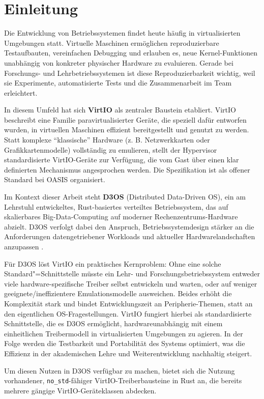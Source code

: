 \chapter{Einleitung}

Die Entwicklung von Betriebssystemen findet heute häufig in virtualisierten Umgebungen statt. Virtuelle Maschinen ermöglichen reproduzierbare Testaufbauten, vereinfachen Debugging und erlauben es, neue Kernel-Funktionen unabhängig von konkreter physischer Hardware zu evaluieren. Gerade bei Forschungs- und Lehrbetriebssystemen ist diese Reproduzierbarkeit wichtig, weil sie Experimente, automatisierte Tests und die Zusammenarbeit im Team erleichtert.

In diesem Umfeld hat sich \textbf{VirtIO} als zentraler Baustein etabliert. VirtIO beschreibt eine Familie paravirtualisierter Geräte, die speziell dafür entworfen wurden, in virtuellen Maschinen effizient bereitgestellt und genutzt zu werden. Statt komplexe “klassische” Hardware (z. B. Netzwerkkarten oder Grafikkartenmodelle) vollständig zu emulieren, stellt der Hypervisor standardisierte VirtIO-Geräte zur Verfügung, die vom Gast über einen klar definierten Mechanismus angesprochen werden. Die Spezifikation ist als offener Standard bei OASIS organisiert.

Im Kontext dieser Arbeit steht \textbf{D3OS} (Distributed Data-Driven OS), ein am Lehrstuhl entwickeltes, Rust-basiertes verteiltes Betriebssystem, das auf skalierbares Big-Data-Com\-pu\-ting auf moderner Rechenzentrums-Hardware abzielt. D3OS verfolgt dabei den Anspruch, Betriebssystemdesign stärker an die Anforderungen datengetriebener Workloads und aktueller Hardwarelandschaften anzupassen \cite{hhu_hermes}.

Für D3OS löst VirtIO ein praktisches Kernproblem: Ohne eine solche Standard"=Schnittstelle müsste ein Lehr- und Forschungsbetriebssystem entweder viele hardware-spezifische Treiber selbst entwickeln und warten, oder auf weniger geeignete/ineffizientere Emulationsmodelle ausweichen. Beides erhöht die Komplexität stark und bindet Entwicklungszeit an Peripherie-Themen, statt an den eigentlichen OS-Fragestellungen. VirtIO fungiert hierbei als standardisierte Schnittstelle, die es D3OS ermöglicht, hardwareunabhängig mit einem einheitlichen Treibermodell in virtualisierten Umgebungen zu agieren. In der Folge werden die Testbarkeit und Portabilität des Systems optimiert, was die Effizienz in der akademischen Lehre und Weiterentwicklung nachhaltig steigert.

Um diesen Nutzen in D3OS verfügbar zu machen, bietet sich die Nutzung vorhandener, \texttt{no\_std}-fähiger VirtIO-Treiberbausteine in Rust an, die bereits mehrere gängige VirtIO-Geräteklassen abdecken.

